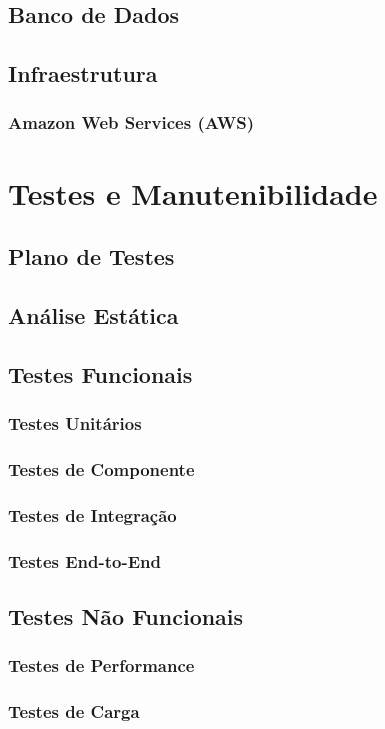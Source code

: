 \subsection{Banco de Dados}
\subsection{Infraestrutura}
\subsubsection{Amazon Web Services (AWS)}

\section{Testes e Manutenibilidade}
\subsection{Plano de Testes}
\subsection{Análise Estática}
\subsection{Testes Funcionais}
\subsubsection{Testes Unitários}
\subsubsection{Testes de Componente}
\subsubsection{Testes de Integração}
\subsubsection{Testes End-to-End}
\subsection{Testes Não Funcionais}
\subsubsection{Testes de Performance}
\subsubsection{Testes de Carga}
